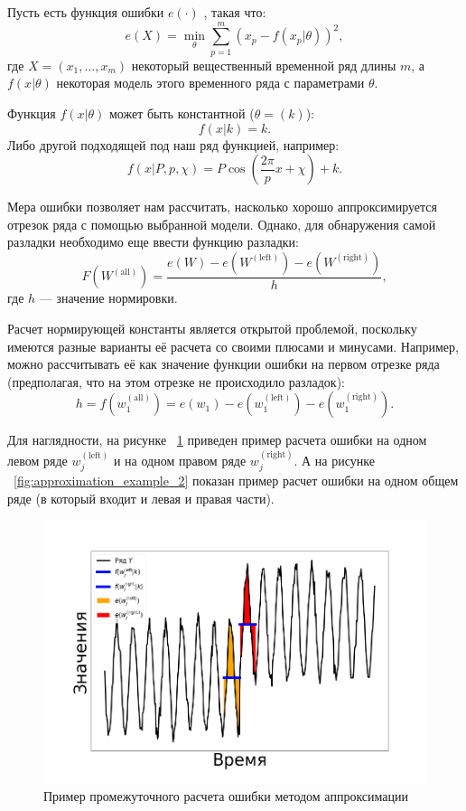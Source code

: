 \documentclass[%
12pt,
master,  %
natbib,      %
subf,        %
substylefile = spbu.rtx,
href,        %
colorlinks,  %
]{disser}
\begin{document}
Пусть есть функция ошибки $e(\cdot)$ , такая что:
$$e(X) = \min_{\theta}{\sum_{p=1}^m(x_p - f(x_p | \theta))^2 },$$
где $X = (x_1, \dots, x_m)$ некоторый вещественный временной ряд длины $m$, а $f(x | \theta)$ некоторая модель этого временного ряда с параметрами $\theta$.

Функция $f(x|\theta)$ может быть константной ($\theta = (k)$):
$$ f(x | k) = k. $$
Либо другой подходящей под наш ряд функцией, например:
$$ f(x | P, p, \chi) = P\cos(\frac{2\pi}{p}x + \chi) + k. $$

Мера ошибки позволяет нам рассчитать, насколько хорошо аппроксимируется отрезок ряда с помощью выбранной модели. Однако, для обнаружения самой разладки необходимо еще ввести функцию разладки:
$$ F(W^{\mathrm{(all)}}) = \frac{e(W) - e(W^{\mathrm{(left)}}) - e(W^{\mathrm{(right)}})}{h}, $$
где $h$ --- значение нормировки.


Расчет нормирующей константы является открытой проблемой, поскольку имеются разные варианты её расчета со своими плюсами и минусами.
Например, можно рассчитывать её как значение функции ошибки на первом отрезке ряда (предполагая, что на этом отрезке не происходило разладок):
$$ h = f(w_1^{\mathrm{(all)}}) = e(w_1) - e(w_1^{\mathrm{(left)}}) - e(w_1^{\mathrm{(right)}}). $$

Для наглядности, на рисунке ~\ref{fig:approximation_example_1} приведен пример расчета ошибки на одном левом ряде $ w_j^{\mathrm{(left)}} $ и на одном правом ряде $ w_j^{\mathrm{(right)}} $. А на рисунке ~\ref{fig:approximation_example_2} показан пример расчет ошибки на одном общем ряде (в который входит и левая и правая части).


\begin{figure}[!hhh]
	\begin{center}
		\includegraphics[width=12cm]{approaches_second_2_ru}
	\end{center}
	\vspace{-5mm}\caption{Пример промежуточного расчета ошибки методом аппроксимации}
	\label{fig:approximation_example_1}
\end{figure}
\end{document}

